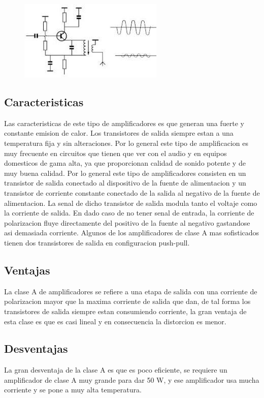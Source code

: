 \documentclass[12pt,a4paper]{article}
\begin{document}
\begin{figure}[h!]
\centering
\includegraphics[scale=1]{260px-AmplificadorclaseA.jpg} 
\end{figure}

\subsection{Caracteristicas}
Las caracteristicas de este tipo de amplificadores es que generan una fuerte y constante emision de calor. Los transistores de salida siempre estan a una temperatura fija y sin alteraciones. Por lo general este tipo de amplificacion es muy frecuente en circuitos que tienen que ver con el audio y en equipos domesticos de gama alta, ya que proporcionan calidad de sonido potente y de muy buena calidad.
Por lo general este tipo de amplificadores consisten en un transistor de salida conectado al dispositivo de la fuente de alimentacion y un transistor de corriente constante conectado de la salida al negativo de la fuente de alimentacion.
La senal de dicho transistor de salida modula tanto el voltaje como la corriente de salida. En dado caso de no tener senal de entrada, la corriente de polarizacion fluye directamente del positivo de la fuente al negativo gastandose asi demasiada corriente. Algunos de los amplificadores de clase A mas sofisticados tienen dos transistores de salida en configuracion push-pull.

\subsection{Ventajas}
La clase A de amplificadores se refiere a una etapa de salida con una corriente de polarizacion mayor que la maxima corriente de salida que dan, de tal forma los transistores de salida siempre estan consumiendo corriente, la gran ventaja de esta clase es que es casi lineal y en consecuencia la distorcion es menor.

\subsection{Desventajas}
La gran desventaja de la clase A es que es poco eficiente, se requiere un amplificador de clase A muy grande para dar 50 W, y ese amplificador usa mucha corriente y se pone a muy alta temperatura.
\end{document}
